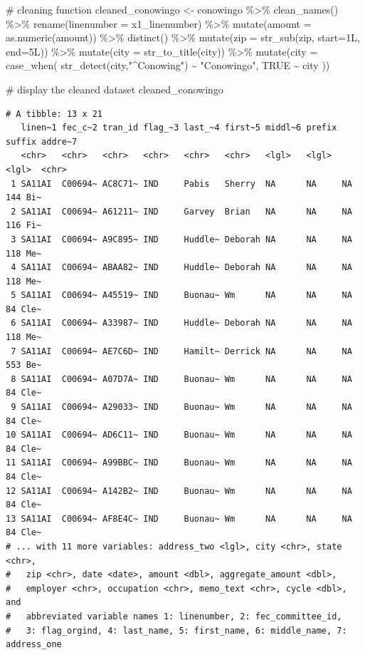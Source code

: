 \documentclass[
  letterpaper,
  DIV=11,
  numbers=noendperiod]{scrreprt}
\newenvironment{Shaded}{\begin{snugshade}}{\end{snugshade}}
\newcommand{\AttributeTok}[1]{\textcolor[rgb]{0.40,0.45,0.13}{#1}}
\newcommand{\CommentTok}[1]{\textcolor[rgb]{0.37,0.37,0.37}{#1}}
\newcommand{\ConstantTok}[1]{\textcolor[rgb]{0.56,0.35,0.01}{#1}}
\newcommand{\FunctionTok}[1]{\textcolor[rgb]{0.28,0.35,0.67}{#1}}
\newcommand{\NormalTok}[1]{\textcolor[rgb]{0.00,0.23,0.31}{#1}}
\newcommand{\OtherTok}[1]{\textcolor[rgb]{0.00,0.23,0.31}{#1}}
\newcommand{\SpecialCharTok}[1]{\textcolor[rgb]{0.37,0.37,0.37}{#1}}
\newcommand{\StringTok}[1]{\textcolor[rgb]{0.13,0.47,0.30}{#1}}
\begin{document}
\begin{Shaded}
\begin{Highlighting}[]
\CommentTok{\# cleaning function}
\NormalTok{cleaned\_conowingo }\OtherTok{\textless{}{-}}\NormalTok{ conowingo }\SpecialCharTok{\%\textgreater{}\%}
  \FunctionTok{clean\_names}\NormalTok{() }\SpecialCharTok{\%\textgreater{}\%}
  \FunctionTok{rename}\NormalTok{(}\AttributeTok{linenumber =}\NormalTok{ x1\_linenumber) }\SpecialCharTok{\%\textgreater{}\%}
  \FunctionTok{mutate}\NormalTok{(}\AttributeTok{amount =} \FunctionTok{as.numeric}\NormalTok{(amount)) }\SpecialCharTok{\%\textgreater{}\%}
  \FunctionTok{distinct}\NormalTok{() }\SpecialCharTok{\%\textgreater{}\%}
  \FunctionTok{mutate}\NormalTok{(}\AttributeTok{zip =} \FunctionTok{str\_sub}\NormalTok{(zip, }\AttributeTok{start=}\NormalTok{1L, }\AttributeTok{end=}\NormalTok{5L)) }\SpecialCharTok{\%\textgreater{}\%}
  \FunctionTok{mutate}\NormalTok{(}\AttributeTok{city =} \FunctionTok{str\_to\_title}\NormalTok{(city)) }\SpecialCharTok{\%\textgreater{}\%}
  \FunctionTok{mutate}\NormalTok{(}\AttributeTok{city =} \FunctionTok{case\_when}\NormalTok{(}
    \FunctionTok{str\_detect}\NormalTok{(city,}\StringTok{"\^{}Conowing"}\NormalTok{) }\SpecialCharTok{\textasciitilde{}} \StringTok{"Conowingo"}\NormalTok{,}
    \ConstantTok{TRUE} \SpecialCharTok{\textasciitilde{}}\NormalTok{ city}
\NormalTok{  ))}


\CommentTok{\# display the cleaned dataset}
\NormalTok{cleaned\_conowingo}
\end{Highlighting}
\end{Shaded}

\begin{verbatim}
# A tibble: 13 x 21
   linen~1 fec_c~2 tran_id flag_~3 last_~4 first~5 middl~6 prefix suffix addre~7
   <chr>   <chr>   <chr>   <chr>   <chr>   <chr>   <lgl>   <lgl>  <lgl>  <chr>  
 1 SA11AI  C00694~ AC8C71~ IND     Pabis   Sherry  NA      NA     NA     144 Bi~
 2 SA11AI  C00694~ A61211~ IND     Garvey  Brian   NA      NA     NA     116 Fi~
 3 SA11AI  C00694~ A9C895~ IND     Huddle~ Deborah NA      NA     NA     118 Me~
 4 SA11AI  C00694~ ABAA82~ IND     Huddle~ Deborah NA      NA     NA     118 Me~
 5 SA11AI  C00694~ A45519~ IND     Buonau~ Wm      NA      NA     NA     84 Cle~
 6 SA11AI  C00694~ A33987~ IND     Huddle~ Deborah NA      NA     NA     118 Me~
 7 SA11AI  C00694~ AE7C6D~ IND     Hamilt~ Derrick NA      NA     NA     553 Be~
 8 SA11AI  C00694~ A07D7A~ IND     Buonau~ Wm      NA      NA     NA     84 Cle~
 9 SA11AI  C00694~ A29033~ IND     Buonau~ Wm      NA      NA     NA     84 Cle~
10 SA11AI  C00694~ AD6C11~ IND     Buonau~ Wm      NA      NA     NA     84 Cle~
11 SA11AI  C00694~ A99BBC~ IND     Buonau~ Wm      NA      NA     NA     84 Cle~
12 SA11AI  C00694~ A142B2~ IND     Buonau~ Wm      NA      NA     NA     84 Cle~
13 SA11AI  C00694~ AF8E4C~ IND     Buonau~ Wm      NA      NA     NA     84 Cle~
# ... with 11 more variables: address_two <lgl>, city <chr>, state <chr>,
#   zip <chr>, date <date>, amount <dbl>, aggregate_amount <dbl>,
#   employer <chr>, occupation <chr>, memo_text <chr>, cycle <dbl>, and
#   abbreviated variable names 1: linenumber, 2: fec_committee_id,
#   3: flag_orgind, 4: last_name, 5: first_name, 6: middle_name, 7: address_one
\end{verbatim}
\end{document}
